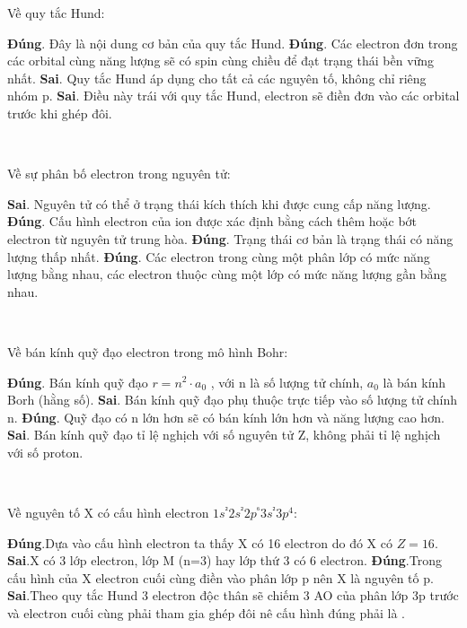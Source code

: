 \def\writeANS{\TLdung{A}\TLdung{B}\TLsai{C}\TLsai{D}}
\begin{loigiaiex}{24}
  Về quy tắc Hund: \begin {itemchoice} \itemch \textbf {Đúng}. Đây là nội dung cơ bản của quy tắc Hund. \itemch \textbf {Đúng}. Các electron đơn trong các orbital cùng năng lượng sẽ có spin cùng chiều để đạt trạng thái bền vững nhất. \itemch \textbf {Sai}. Quy tắc Hund áp dụng cho tất cả các nguyên tố, không chỉ riêng nhóm p. \itemch \textbf {Sai}. Điều này trái với quy tắc Hund, electron sẽ điền đơn vào các orbital trước khi ghép đôi. \end {itemchoice}  \phantom {a}\hfill { \faKey ~\writeANS }
\end{loigiaiex}
\def\writeANS{\TLsai{A}\TLdung{C}\TLdung{D}}
\begin{loigiaiex}{25}
  Về sự phân bố electron trong nguyên tử: \begin {itemchoice} \itemch \textbf {Sai}. Nguyên tử có thể ở trạng thái kích thích khi được cung cấp năng lượng. \itemch \textbf {Đúng}. Cấu hình electron của ion được xác định bằng cách thêm hoặc bớt electron từ nguyên tử trung hòa. \itemch \textbf {Đúng}. Trạng thái cơ bản là trạng thái có năng lượng thấp nhất. \itemch \textbf {Đúng}. Các electron trong cùng một phân lớp có mức năng lượng bằng nhau, các electron thuộc cùng một lớp có mức năng lượng gần bằng nhau. \end {itemchoice}  \phantom {a}\hfill { \faKey ~\writeANS }
\end{loigiaiex}
\def\writeANS{\TLdung{A}\TLsai{B}\TLdung{C}\TLsai{D}}
\begin{loigiaiex}{26}
  Về bán kính quỹ đạo electron trong mô hình Bohr: \begin {itemchoice} \itemch \textbf {Đúng}. Bán kính quỹ đạo $r = n^2 \cdot a_0$ , với n là số lượng tử chính, $a_0$ là bán kính Borh (hằng số). \itemch \textbf {Sai}. Bán kính quỹ đạo phụ thuộc trực tiếp vào số lượng tử chính n. \itemch \textbf {Đúng}. Quỹ đạo có n lớn hơn sẽ có bán kính lớn hơn và năng lượng cao hơn. \itemch \textbf {Sai}. Bán kính quỹ đạo tỉ lệ nghịch với số nguyên tử Z, không phải tỉ lệ nghịch với số proton. \end {itemchoice}  \phantom {a}\hfill { \faKey ~\writeANS }
\end{loigiaiex}
\def\writeANS{\TLdung{C}\TLsai{D}}
\begin{loigiaiex}{27}
  Về nguyên tố X có cấu hình electron $1s^²2s^²2p^⁶3s^²3p^4$: \begin {itemchoice} \itemch \textbf {Đúng}.Dựa vào cấu hình electron ta thấy X có 16 electron do đó X có $Z=16$. \itemch \textbf {Sai}.X có 3 lớp electron, lớp M (n=3) hay lớp thứ 3 có 6 electron. \itemch \textbf {Đúng}.Trong cấu hình của X electron cuối cùng điền vào phân lớp p nên X là nguyên tố p. \itemch \textbf {Sai}.Theo quy tắc Hund 3 electron độc thân sẽ chiếm 3 AO của phân lớp 3p trước và electron cuối cùng phải tham gia ghép đôi nê cấu hình đúng phải là . \end {itemchoice}  \phantom {a}\hfill { \faKey ~\writeANS }
\end{loigiaiex}
